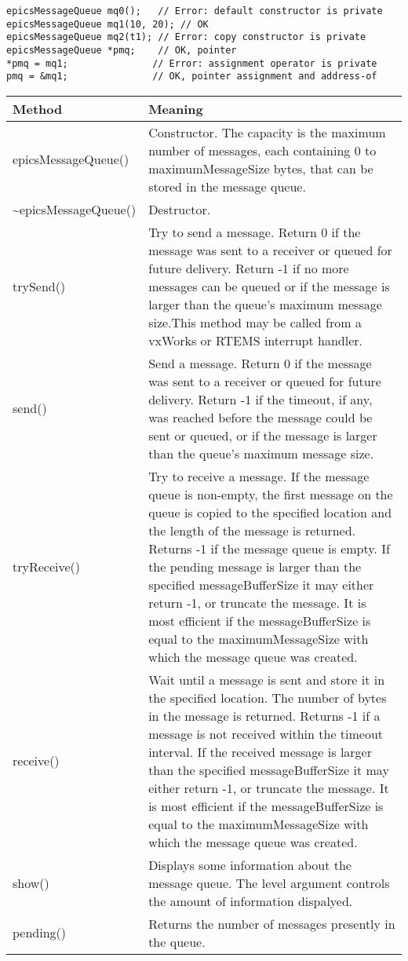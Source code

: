\begin{verbatim}epicsMessageQueue mq0();   // Error: default constructor is private
epicsMessageQueue mq1(10, 20); // OK
epicsMessageQueue mq2(t1); // Error: copy constructor is private
epicsMessageQueue *pmq;    // OK, pointer
*pmq = mq1;               // Error: assignment operator is private
pmq = &mq1;               // OK, pointer assignment and address-of
\end{verbatim}
\begin{center}\begin{longtable}{p{1.35in}p{5.0in}}
\textbf{Method} & \textbf{Meaning}\\
\hline
epicsMessageQueue() & Constructor. The capacity is the maximum number of messages, each containing 0 to maximumMessageSize bytes, that can be stored in the message queue.\\
\~{}epicsMessageQueue() & Destructor.\\
trySend() & Try to send a message.  Return 0 if the message was sent to a receiver or queued for future delivery.  Return -1 if no more messages can be queued or if the message is larger than the queue's maximum message size.This method may be called from a vxWorks or RTEMS interrupt handler.\\
send() & Send a message.  Return 0 if the message was sent to a receiver or queued for future delivery.  Return -1 if the timeout, if any, was reached before the message could be sent or queued, or if the message is larger than the queue's maximum message size.\\
tryReceive() & Try to receive a message.  If the message queue is non-empty, the first message on the queue is copied to the specified location and the length of the message is returned.  Returns -1 if the message queue is empty.  If the pending message is larger than the specified messageBufferSize it may either return -1, or truncate the message.  It is most efficient if the messageBufferSize is equal to the maximumMessageSize with which the message queue was created.\\
receive() & Wait until a message is sent and store it in the specified location.  The number of bytes in the message is returned.  Returns -1 if a message is not received within the timeout interval. If the received message is larger than the specified messageBufferSize it may either return -1, or truncate the message.  It is most efficient if the messageBufferSize is equal to the maximumMessageSize with which the message queue was created.\\
show() & Displays some information about the message queue.  The level argument controls the amount of information dispalyed.\\
pending() & Returns the number of messages presently in the queue.
\end{longtable}\end{center}



